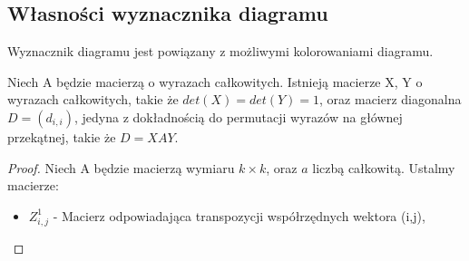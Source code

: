 \subsection{Własności wyznacznika diagramu}
Wyznacznik diagramu jest powiązany z możliwymi kolorowaniami diagramu.

\begin{lemat}
Niech A będzie macierzą o wyrazach całkowitych. Istnieją macierze X, Y o wyrazach całkowitych, takie że $det(X)=det(Y)=1$, oraz macierz diagonalna $D=(d_{i,i})$, jedyna z dokładnością do permutacji wyrazów na głównej przekątnej, takie że $D=XAY$.
\end{lemat}
\begin{proof}
Niech A będzie macierzą wymiaru $k \times k$, oraz  $a$ liczbą całkowitą. Ustalmy macierze:
\begin{itemize}
\item $Z^1_{i,j}$  -  Macierz odpowiadająca transpozycji współrzędnych wektora (i,j),


\end{itemize}
\end{proof}
